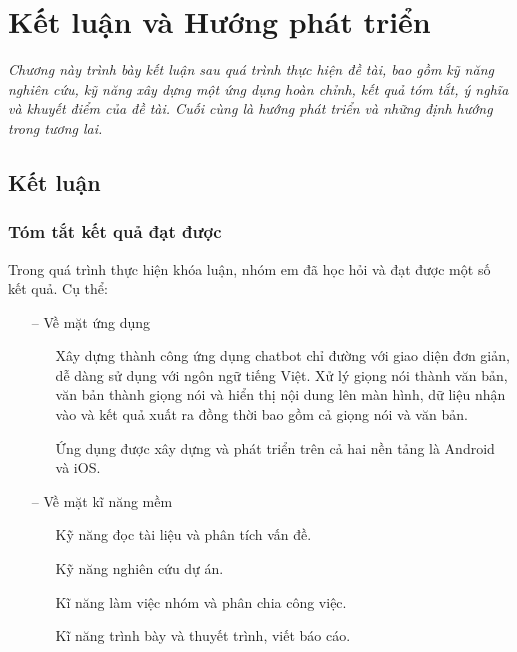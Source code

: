 \chapter{Kết luận và Hướng phát triển}
\label{Chapter6}

\emph{Chương này trình bày kết luận sau quá trình thực hiện đề tài, bao gồm kỹ năng nghiên cứu, kỹ năng xây dựng một ứng dụng hoàn chỉnh, kết quả tóm tắt, ý nghĩa và khuyết điểm của đề tài. Cuối cùng là hướng phát triển và những định hướng trong tương lai.}

\section{Kết luận}
\label{sec:ket-luan}

\subsection{Tóm tắt kết quả đạt được}

Trong quá trình thực hiện khóa luận, nhóm em đã học hỏi và đạt được một số kết quả. Cụ thể:

\begin{itemize}
    \item[--] Về mặt ứng dụng
        \begin{itemize}
            \item[\textbullet] Xây dựng thành công ứng dụng chatbot chỉ đường với giao diện đơn giản, dễ dàng sử dụng với ngôn ngữ tiếng Việt. Xử lý giọng nói thành văn bản, văn bản thành giọng nói và hiển thị nội dung lên màn hình, dữ liệu nhận vào và kết quả xuất ra đồng thời bao gồm cả giọng nói và văn bản.
            \item[\textbullet] Ứng dụng được xây dựng và phát triển trên cả hai nền tảng là Android và iOS.
        \end{itemize}
    \item[--] Về mặt kĩ năng mềm
        \begin{itemize}
            \item[\textbullet] Kỹ năng đọc tài liệu và phân tích vấn đề.
            \item[\textbullet] Kỹ năng nghiên cứu dự án.
            \item[\textbullet] Kĩ năng làm việc nhóm và phân chia công việc.
            \item[\textbullet] Kĩ năng trình bày và thuyết trình, viết báo cáo.
        \end{itemize}
\end{itemize}

